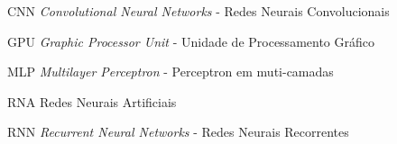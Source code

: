 \documentclass[
	12pt,				%
	oneside,			%
	a4paper,			%
	english,			%
	french,				%
	spanish,			%
	brazil,				%
	]{abntex2}
\begin{document}

\frenchspacing 



\imprimirfolhaderosto


\begin{siglas}
	\item[CNN] \textit{Convolutional Neural Networks} - Redes Neurais Convolucionais
	\item[GPU] \textit{Graphic Processor Unit} - Unidade de Processamento Gráfico
	\item[MLP] \textit{Multilayer Perceptron} - Perceptron em muti-camadas
	\item[RNA] Redes Neurais Artificiais
	\item[RNN] \textit{Recurrent Neural Networks} - Redes Neurais Recorrentes
\end{siglas}


\tableofcontents*



\textual

\end{document}

